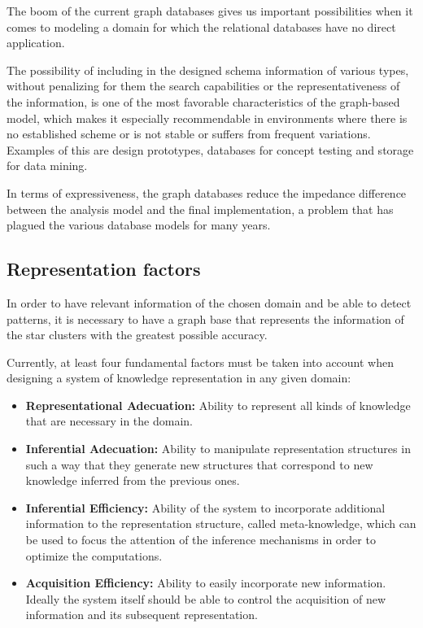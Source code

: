 \ifdefined\ingles	
	The boom of the current graph databases gives us important possibilities when it comes to modeling a domain for which the relational databases have no direct application.
	
	The possibility of including in the designed schema information of various types, without penalizing for them the search capabilities or the representativeness of the information, is one of the most favorable characteristics of the graph-based model, which makes it especially recommendable in environments where there is no established scheme or is not stable or suffers from frequent variations. Examples of this are design prototypes, databases for concept testing and storage for data mining\cite{robinson2015graph}.
	
	In terms of expressiveness, the graph databases reduce the impedance difference between the analysis model and the final implementation, a problem that has plagued the various database models for many years.
	
	\subsection {Representation factors}
	
	In order to have relevant information of the chosen domain and be able to detect patterns, it is necessary to have a graph base that represents the information of the star clusters with the greatest possible accuracy.
	
	Currently, at least four fundamental factors must be taken into account when designing a system of knowledge representation in any given domain\cite{van2008handbook}:
	
	\begin{itemize}
		\item \textbf{Representational Adecuation:} Ability to represent all kinds of knowledge that are necessary in the domain.
		\item \textbf{Inferential Adecuation:} Ability to manipulate representation structures in such a way that they generate new structures that correspond to new knowledge inferred from the previous ones.
		\item \textbf{Inferential Efficiency:} Ability of the system to incorporate additional information to the representation structure, called meta-knowledge, which can be used to focus the attention of the inference mechanisms in order to optimize the computations.
		\item \textbf {Acquisition Efficiency:} Ability to easily incorporate new information. Ideally the system itself should be able to control the acquisition of new information and its subsequent representation.
	\end{itemize}
	
